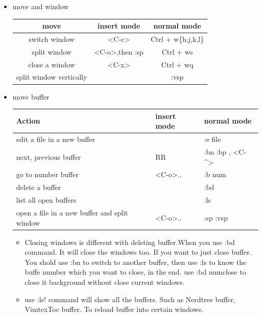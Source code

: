 \documentclass[a4paper,12pt,twoside]{book}
\begin{document}
\begin{itemize}
\item move and window

\begin{center}
   
  \begin{tabular}{c|c|c}
   \hline
		move & insert mode & normal mode \\
		
\hline 
		switch window & <C-c> &  Ctrl + w\{h,j,k,l\}\\
				
		\hline 
		split window & <C-o>,then :sp  &  Ctrl + ws\\
		
		\hline 
		close a window & <C-x> & Ctrl + wq\\
		
		\hline
		split window vertically	&   & :vsp \\ 

			\end{tabular}
	\end{center}

\item move  buffer

\begin{center}
\begin{tabular}{p{}|p{}|p{}}
   \hline
		Action & insert mode & normal mode \\
		
\hline 
		edit a file in a new buffer & &  :e file\\
				
		\hline 
		next, previous buffer & RR &  :bn :bp , <C-\^{}> \\
		
        \hline 
		go to number buffer &<C-o>.. &  :b num \\		
		
		\hline 
		delete a buffer & & :bd \\
		
		\hline 
		list all open buffers & & :ls\\
		
		\hline
		open a file in a new buffer and split window
	 & <C-o>..& :sp :vsp \\
		
			\end{tabular}
	\end{center}

	\begin{itemize}
			\item Closing windows is different with deleting buffer.When you use :bd command. It will close the windows too. If you want to just close buffer. You shold use :bn to switch to another buffer, then use :ls to know the buffe number which you want to close, in the end. use :bd numclose to close it background without close current windows.
				\item use :ls! command will show all the buffers. Such as Nerdtree buffer, VimtexToc buffer. To reload buffer into certain windows. 


\end{itemize}
\end{itemize}
\end{document}
